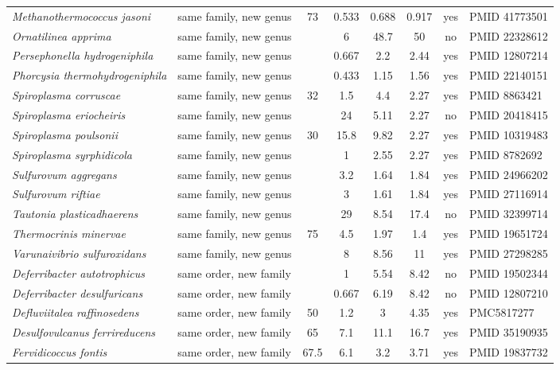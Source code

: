 {\begin{longtable}{llcccccl}
\textit{Methanothermococcus jasoni} & same family, new genus & 73 & 0.533 & 0.688 & 0.917 & yes & PMID 41773501 \\
\textit{Ornatilinea apprima} & same family, new genus &  & 6 & 48.7 & 50 & no & PMID 22328612 \\
\textit{Persephonella hydrogeniphila} & same family, new genus &  & 0.667 & 2.2 & 2.44 & yes & PMID 12807214 \\
\textit{Phorcysia thermohydrogeniphila} & same family, new genus &  & 0.433 & 1.15 & 1.56 & yes & PMID 22140151 \\
\textit{Spiroplasma corruscae} & same family, new genus & 32 & 1.5 & 4.4 & 2.27 & yes & PMID 8863421 \\
\textit{Spiroplasma eriocheiris} & same family, new genus &  & 24 & 5.11 & 2.27 & no & PMID 20418415 \\
\textit{Spiroplasma poulsonii} & same family, new genus & 30 & 15.8 & 9.82 & 2.27 & yes & PMID 10319483 \\
\textit{Spiroplasma syrphidicola} & same family, new genus &  & 1 & 2.55 & 2.27 & yes & PMID 8782692 \\
\textit{Sulfurovum aggregans} & same family, new genus &  & 3.2 & 1.64 & 1.84 & yes & PMID 24966202 \\
\textit{Sulfurovum riftiae} & same family, new genus &  & 3 & 1.61 & 1.84 & yes & PMID 27116914 \\
\textit{Tautonia plasticadhaerens} & same family, new genus &  & 29 & 8.54 & 17.4 & no & PMID 32399714 \\
\textit{Thermocrinis minervae} & same family, new genus & 75 & 4.5 & 1.97 & 1.4 & yes & PMID 19651724 \\
\textit{Varunaivibrio sulfuroxidans} & same family, new genus &  & 8 & 8.56 & 11 & yes & PMID 27298285 \\
\textit{Deferribacter autotrophicus} & same order, new family &  & 1 & 5.54 & 8.42 & no & PMID 19502344 \\
\textit{Deferribacter desulfuricans} & same order, new family &  & 0.667 & 6.19 & 8.42 & no & PMID 12807210 \\
\textit{Defluviitalea raffinosedens} & same order, new family & 50 & 1.2 & 3 & 4.35 & yes & PMC5817277 \\
\textit{Desulfovulcanus ferrireducens} & same order, new family & 65 & 7.1 & 11.1 & 16.7 & yes & PMID 35190935 \\
\textit{Fervidicoccus fontis} & same order, new family & 67.5 & 6.1 & 3.2 & 3.71 & yes & PMID 19837732 \\

\end{longtable}}
